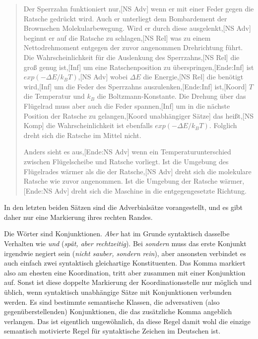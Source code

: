 \begin{sloppypar}
\begin{quote}
Der Sperrzahn funktioniert nur,[NS Adv] wenn er mit einer Feder gegen die Ratsche gedrückt wird.
Auch er unterliegt dem Bombardement der Brownschen Molekularbewegung.
Wird er durch diese ausgelenkt,[NS Adv] beginnt er auf die Ratsche zu schlagen,[NS Rel] was zu einem Nettodrehmoment entgegen der zuvor angenommen Drehrichtung führt.
Die Wahrscheinlichkeit für die Auslenkung des Sperrzahns,[NS Rel] die groß genug ist,[Inf] um eine Ratschenposition zu überspringen,[Ende:Inf] ist $exp(-\Delta E/k_BT)$,[NS Adv] wobei $\Delta E$ die Energie,[NS Rel] die benötigt wird,[Inf] um die Feder des Sperrzahns auszulenken,[Ende:Inf] ist,[Koord] $T$ die Temperatur und $k_B$ die Boltzmann-Konstante.
Die Drehung über das Flügelrad muss aber auch die Feder spannen,[Inf] um in die nächste Position der Ratsche zu gelangen,[Koord unabhängiger Sätze] das heißt,[NS Komp] die Wahrscheinlichkeit ist ebenfalls $exp(-\Delta E/k_BT)$.
Folglich dreht sich die Ratsche im Mittel nicht.

Anders sieht es aus,[Ende:NS Adv] wenn ein Temperaturunterschied zwischen Flügelscheibe und Ratsche vorliegt.
Ist die Umgebung des Flügelrades wärmer als die der Ratsche,[NS Adv] dreht sich die molekulare Ratsche wie zuvor angenommen.
Ist die Umgebung der Ratsche wärmer,[Ende:NS Adv] dreht sich die Maschine in die entgegengesetzte Richtung.
\end{quote}
\end{sloppypar}

In den letzten beiden Sätzen sind die Adverbialsätze vorangestellt, und es gibt daher nur eine Markierung ihres rechten Randes.

\label{sol:morphosyntaktischeschreibprinzipien03} Die Wörter sind Konjunktionen.
\textit{Aber} hat im Grunde syntaktisch dasselbe Verhalten wie \textit{und} (\textit{spät, aber rechtzeitig}).
Bei \textit{sondern} muss das erste Konjunkt irgendwie negiert sein (\textit{nicht sauber, sondern rein}), aber ansonsten verbindet es auch einfach zwei syntaktisch gleichartige Konstituenten.
Das Komma markiert also am ehesten eine Koordination, tritt aber zusammen mit einer Konjunktion auf.
Sonst ist diese doppelte Markierung der Koordinationsstelle nur möglich und üblich, wenn syntaktisch unabhängige Sätze mit Konjunktionen verbunden werden.
Es sind bestimmte semantische Klassen, \zB die adversativen (also gegenüberstellenden) Konjunktionen, die das zusätzliche Komma angeblich verlangen.
Das ist eigentlich ungewöhnlich, da diese Regel damit wohl die einzige semantisch motivierte Regel für syntaktische Zeichen im Deutschen ist.

